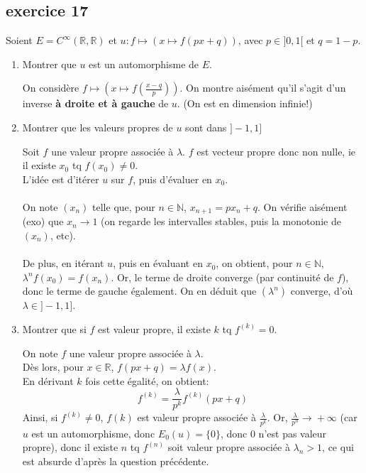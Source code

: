 \documentclass[a4paper,12pt]{article}
\begin{document}
	
	\subsection*{exercice 17}
	Soient $E = C^\infty (\mathbb R, \mathbb R)$ et $u: f \mapsto \left(x \mapsto f (px + q)\right)$, avec $p \in ]0, 1[$ et $q = 1 - p$.
	\begin{enumerate}
		\item Montrer que $u$ est un automorphisme de $E$.
		\begin{correctionbox}
			On considère $ f \mapsto \left(x \mapsto f(\frac{x-q} p)\right)$. On montre aisément qu'il s'agit d'un inverse \textbf{à droite et à gauche} de $u$. (On est en dimension infinie!)
		\end{correctionbox}
		
		\item Montrer que les valeurs propres de $u$ sont dans $]-1, 1]$
		\begin{correctionbox}
			Soit $f$ une valeur propre associée à $\lambda$. $f$ est vecteur propre donc non nulle, ie il existe $x_0$ tq $f(x_0) \not = 0$. \\
			L'idée est d'itérer $u$ sur $f$, puis d'évaluer en $x_0$.\\
			\\
			On note $(x_n)$ telle que, pour $n \in \mathbb N$, $x_{n+1} = px_n + q$. On vérifie aisément (exo) que $x_n \xrightarrow{} 1$ (on regarde les intervalles stables, puis la monotonie de $(x_n)$, etc). \\ \\
			De plus, en itérant $u$, puis en évaluant en $x_0$, on obtient, pour $n \in \mathbb N$, $\lambda^n f(x_0) = f(x_n)$. Or, le terme de droite converge (par continuité de $f$), donc le terme de gauche également. On en déduit que $(\lambda^n)$ converge, d'où $\lambda \in ]-1, 1]$.
		\end{correctionbox}
		
		\item Montrer que si $f$ est valeur propre, il existe $k$ tq $f^{(k)}=0$.
		\begin{correctionbox}
			On note $f$ une valeur propre associée à $\lambda$. \\
			Dès lors, pour $x \in \mathbb R$, $f(px+q)=\lambda f(x)$. \\
			En dérivant $k$ fois cette égalité, on obtient: $$f^{(k)} = \frac \lambda {p^k} f^{(k)}(px+q)$$
			Ainsi, si $f^{(k)} \not = 0$, $f{(k)}$ est valeur propre associée à $\frac \lambda {p^k}$. Or, $\frac \lambda {p^n} \xrightarrow{} +\infty$ (car $u$ est un automorphisme, donc $E_0(u)=\{0\}$, donc 0 n'est pas valeur propre), donc il existe $n$ tq $f^{(n)}$ soit valeur propre associée à $\lambda_n > 1$, ce qui est absurde d'après la question précédente.
		\end{correctionbox}
		

\end{enumerate}
\end{document}
